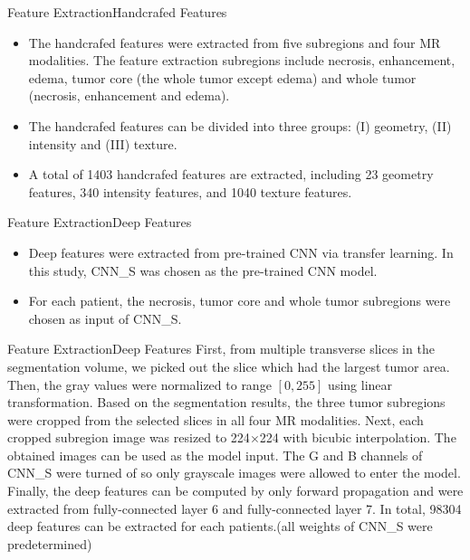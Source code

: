 \documentclass[
]{beamer}
\begin{document}
	\begin{frame}{Feature Extraction}{Handcrafed Features}
		\begin{itemize}
			\item The handcrafed features were extracted from five subregions
			and four MR modalities. The feature extraction subregions include necrosis, enhancement, edema, tumor core
			(the whole tumor except edema) and whole tumor (necrosis, enhancement and edema). 
			\item The handcrafed features
			can be divided into three groups: (I) geometry, (II) intensity and (III) texture. 
			\item A total of
			1403 handcrafed features are extracted, including 23 geometry features, 340 intensity features, and 1040 texture
			features. 
		\end{itemize}
	\end{frame}
	
	\begin{frame}{Feature Extraction}{Deep Features}
		\begin{itemize}
			\item Deep features were extracted from pre-trained CNN via transfer learning. In this study, CNN\_S
			was chosen as the pre-trained CNN model.
			\item For each patient, the necrosis, tumor core and whole tumor subregions were chosen
			as input of CNN\_S.
		\end{itemize}
	\end{frame}
	
	\begin{frame}{Feature Extraction}{Deep Features}
		First, from multiple transverse slices in the segmentation volume, we picked out the slice
		which had the largest tumor area. Then, the gray values were normalized to range 
		$\left[0, 255\right]$ using linear transformation.
		Based on the segmentation results, the three tumor subregions were cropped from the selected slices
		in all four MR modalities. Next, each cropped subregion image was resized to 224$\times$224 with bicubic interpolation.
		The obtained images can be used as the model input. The G and B channels of CNN\_S were turned of
		so only grayscale images were allowed to enter the model. Finally, the deep features can be computed by only
		forward propagation and were extracted from fully-connected layer 6 and fully-connected layer 7.  In total, 98304 deep features can be extracted for each patients.(all weights of CNN\_S were predetermined)
	\end{frame}
	
\end{document}
